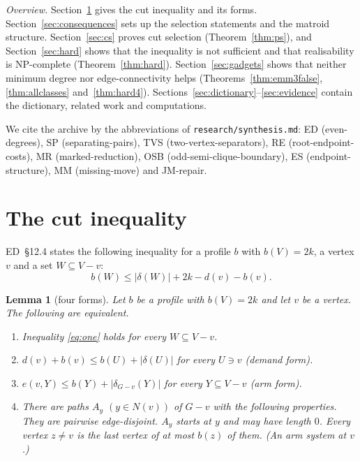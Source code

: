 \documentclass[11pt]{amsart}
\newtheorem{lemma}[theorem]{Lemma}
\theoremstyle{definition}
\begin{document}
\emph{Overview.} Section~\ref{sec:emm} gives the cut inequality and its forms. Section~\ref{sec:consequences}
sets up the selection statements and the matroid structure. Section~\ref{sec:cs} proves cut selection
(Theorem~\ref{thm:ps}), and Section~\ref{sec:hard} shows that the inequality is not sufficient and
that realisability is NP-complete (Theorem~\ref{thm:hard}). Section~\ref{sec:gadgets} shows that
neither minimum degree nor edge-connectivity helps (Theorems~\ref{thm:emm3false},
\ref{thm:allclasses} and~\ref{thm:hard4}). Sections~\ref{sec:dictionary}--\ref{sec:evidence}
contain the dictionary, related work and computations.

We cite the archive by the abbreviations of \texttt{research/synthesis.md}:
ED (even-degrees), SP (separating-pairs), TVS (two-vertex-separators), RE (root-endpoint-costs),
MR (marked-reduction), OSB (odd-semi-clique-boundary), ES (endpoint-structure), MM (missing-move)
and JM-repair.

\section{The cut inequality}\label{sec:emm}

ED~\S12.4 states the following inequality for a profile $b$ with $b(V)=2k$, a vertex $v$ and a set
$W\subseteq V-v$:
\begin{equation}\label{eq:one}
b(W)\le |\delta(W)|+2k-d(v)-b(v).
\end{equation}

\begin{lemma}[four forms]\label{lem:forms}
Let $b$ be a profile with $b(V)=2k$ and let $v$ be a vertex. The following are equivalent.
\begin{enumerate}
\item[(a)] Inequality \eqref{eq:one} holds for every $W\subseteq V-v$.
\item[(b)] $d(v)+b(v)\le b(U)+|\delta(U)|$ for every $U\ni v$ (demand form).
\item[(c)] $e(v,Y)\le b(Y)+|\delta_{G-v}(Y)|$ for every $Y\subseteq V-v$ (arm form).
\item[(d)] There are paths $A_y$ $(y\in N(v))$ of $G-v$ with the following properties. They are
pairwise edge-disjoint. $A_y$ starts at $y$ and may have length $0$. Every vertex $z\ne v$ is the
last vertex of at most $b(z)$ of them. (An \emph{arm system} at $v$.)
\end{enumerate}
\end{lemma}
\end{document}
